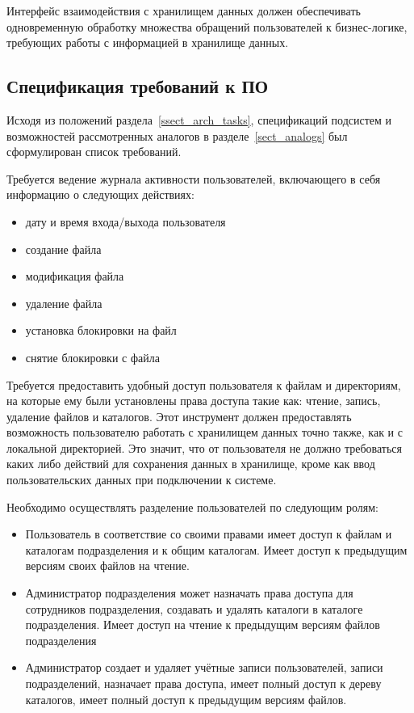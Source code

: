 \documentclass[utf8,usehyperref,12pt]{G7-32}
\begin{document}
Интерфейс взаимодействия с хранилищем данных должен обеспечивать одновременную обработку множества обращений пользователей к бизнес-логике, требующих работы с информацией в хранилище данных.

\subsection{Спецификация требований к ПО}\label{ssect_soft_req}
Исходя из положений раздела~\ref{ssect_arch_tasks}, спецификаций подсистем и возможностей рассмотренных аналогов в разделе~\ref{sect_analogs} был сформулирован список требований.

Требуется ведение журнала активности пользователей, включающего в себя информацию о следующих действиях: 
\begin{itemize}
\item дату и время входа/выхода пользователя
\item создание файла
\item модификация файла
\item удаление файла
\item установка блокировки на файл
\item снятие блокировки с файла
\end{itemize}

Требуется предоставить удобный доступ пользователя к файлам и директориям, на которые ему были установлены права доступа такие как: чтение, запись, удаление файлов и каталогов. Этот инструмент должен предоставлять возможность пользователю работать с хранилищем данных точно также, как и с локальной директорией. Это значит, что от пользователя не должно требоваться каких либо действий для сохранения данных в хранилище, кроме как ввод пользовательских данных при подключении к системе.

Необходимо осуществлять разделение пользователей по следующим ролям:	
\begin{itemize}
\item Пользователь 	в соответствие со своими правами имеет 	доступ к файлам и каталогам подразделения и к общим каталогам. Имеет доступ к предыдущим версиям своих файлов на чтение. 		
\item Администратор подразделения может назначать права доступа для сотрудников подразделения, создавать и удалять каталоги в каталоге подразделения. Имеет доступ на чтение к предыдущим версиям файлов подразделения	
\item Администратор создает и удаляет учётные записи пользователей, записи подразделений, назначает права доступа, имеет полный 	доступ к дереву каталогов, имеет полный 	доступ к предыдущим версиям файлов.
\end{itemize}
\end{document}
